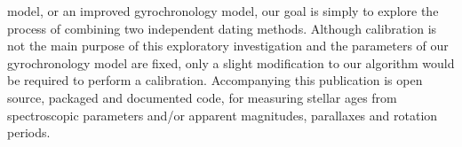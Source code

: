 model, or an improved gyrochronology model, our goal is simply to explore the
process of combining two independent dating methods.
Although calibration is not the main purpose of this exploratory investigation
and the parameters of our gyrochronology model are fixed, only a slight
modification to our algorithm would be required to perform a calibration.
Accompanying this publication is open source, packaged and documented code,
for measuring stellar ages from spectroscopic parameters and/or apparent
magnitudes, parallaxes and rotation periods.




